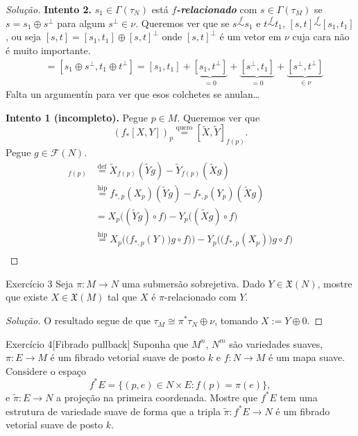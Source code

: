 \begin{proof}[Solução]\leavevmode
	\textbf{Intento 2.} \(s_1 \in \Gamma(\tau_N)\) está \textit{\textbf{\(f\)-relacionado}} com \(s \in \Gamma(\tau_M)\) se \(s=s_1\oplus s^\perp\) para algum \(s^\perp\in\nu\). Queremos ver que se \(s\overset{f}{\sim}s_1\) e \(t \overset{f}{\sim}t_1\), \([s,t]\overset{f}{\sim}[s_1,t_1]\), ou seja \([s,t]=[s_1,t_1]\oplus [s,t]^\perp\) onde \([s,t]^\perp\) é um vetor em \(\nu\) cuja cara não  é muito importante.
	\begin{align*}
		[s,t]&=[s_1\oplus s^\perp,t_1\oplus t^\perp]=[s_1,t_1]+\underbrace{[s_1,t^\perp]}_{=0}+\underbrace{[s^\perp,t_1]}_{=0}+\underbrace{[s^\perp,t^\perp]}_{\in \nu}
	\end{align*}
{\color{4}Falta un argumentín para ver que esos colchetes se anulan…}

\textbf{Intento 1 (incompleto).} Pegue \(p \in M\). Queremos ver que
\[(f_{*}[X,Y])_p\overset{\text{quero}}{=}[\tilde{X},\tilde{Y}]_{f(p)}.\]
Pegue \(g \in \mathcal{F}(N)\).
\begin{align*}
	[\tilde{X},\tilde{Y}]_{f(p)}&\overset{\operatorname{def}}{=}\tilde{X}_{f(p)}(\tilde{Y}g)-\tilde{Y}_{f(p)}(\tilde{X}g)\\
	&\overset{\operatorname{hip}}{=}f_{*,p}(X_p)(\tilde{Y}g)-f_{*,p}(Y_p)(\tilde{X}g)\\
	&=X_{p}\Big((\tilde{Y}g)\circ f\Big)-Y_p\Big((\tilde{X}g)\circ f\Big)\\
	&\overset{\operatorname{hip}}{=}X_p\Big(\big(f_{*,p}(Y)\big)g\circ f)\Big)-Y_p\Big(\big(f_{*,p}(X_p)\big)g \circ f\Big)\\
\end{align*}
\end{proof}

\begin{thing4}{Exercício 3}\label{exer:3}\leavevmode
Seja \(\pi:M \to N\) uma submersão sobrejetiva. Dado \(Y \in \mathfrak{X}(N)\), mostre que existe \(X \in \mathfrak{X}(M)\) tal que \(X\) é \(\pi\)-relacionado com \(Y\).
\end{thing4}
\begin{proof}[Solução]\leavevmode
O resultado segue de que \(\tau_M\cong\pi^*\tau_N\oplus \nu\), tomando \(X:=Y\oplus 0\).
\end{proof}

\begin{thing4}{Exercício 4}[Fibrado pullback]\label{exer:4}\leavevmode
Suponha que \(M^n\), \(N^m\) são variedades suaves, \(\pi:E \to M\) é um fibrado vetorial suave de posto \(k\) e \(f:N \to M\) é um mapa suave. Considere o espaço
\[f^*E=\{(p,e) \in N \times E:f(p)=\pi(e)\},\]
e \(\tilde{\pi}:E \to N\) a projeção na primeira coordenada. Mostre que \(f^*E\) tem uma estrutura de variedade suave de forma que a tripla \(\tilde{\pi}:f^*E\to N\) é um fibrado vetorial suave de posto \(k\).
\end{thing4}

